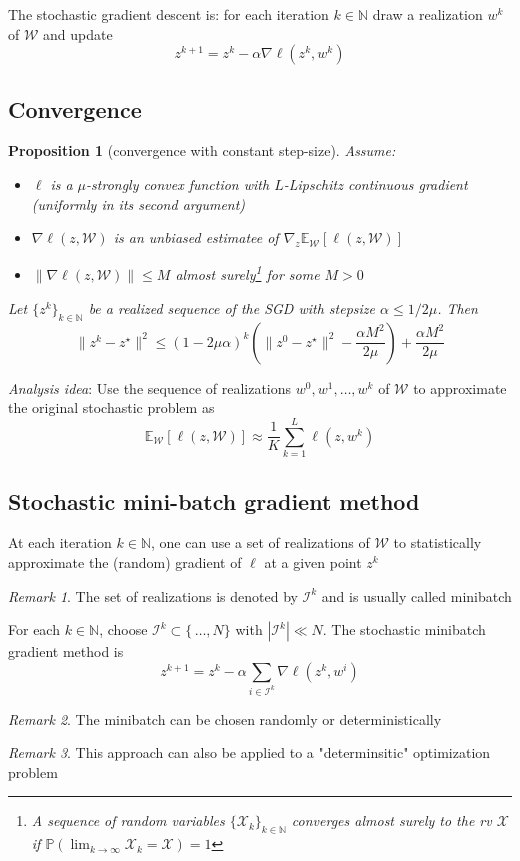 \documentclass{book}
\newcommand{\N}{\mathbb{N}}
\theoremstyle{theoremv2}
\newtheorem{proposition}{Proposition}[chapter]
\theoremstyle{defv2}
\theoremstyle{remark}
\newtheorem*{remark}{Remark}
\theoremstyle{remark}
\theoremstyle{definition}
\theoremstyle{definition}
\begin{document}
The stochastic gradient descent is: for each iteration $k\in\N$ draw a realization $w^k$ of $\mathcal{W}$ and update 
\[
    z^{k+1} = z^k -\alpha\nabla\ell(z^k,w^k)
\]
\subsection{Convergence}
\begin{proposition}[convergence with constant step-size]
    Assume: 
    \begin{itemize}
        \item $\ell$ is a $\mu$-strongly convex function with $L$-Lipschitz continuous gradient (uniformly in its second argument)
        \item $\nabla\ell(z,\mathcal{W})$ is an unbiased estimatee of $\nabla_z\mathbb{E}_{\mathcal{W}}[\ell(z,\mathcal{W})]$
        \item $\|\nabla\ell(z,\mathcal{W})\|\leq M$ almost surely\footnote{A sequence of random variables $\{\mathcal{X}_k\}_{k\in\N}$ converges almost surely to the rv $\mathcal{X}$ if $\mathbb{P}(\lim_{k\to\infty}\mathcal{X}_k=\mathcal{X})=1$} for some $M>0$
    \end{itemize}
    Let $\{z^k\}_{k\in\N}$ be a realized sequence of the SGD with stepsize $\alpha\leq 1/2 \mu$. Then 
    \[
        \|z^k-z^\star\|^2\leq (1-2\mu\alpha)^k\left(\|z^0-z^\star\|^2 - \displaystyle\frac{\alpha M^2}{2\mu}\right) + \displaystyle\frac{\alpha M^2}{2\mu}
    \]
\end{proposition} 
\emph{Analysis idea}: Use the sequence of realizations $w^0,w^1,\dots,w^k$ of $\mathcal{W}$ to approximate the original stochastic problem as 
\[
    \mathbb{E}_{\mathcal{W}}[\ell(z,\mathcal{W})] \approx \displaystyle\frac{1}{K}\displaystyle\sum_{k=1}^{L}\ell(z,w^k)
\]
\subsection{Stochastic mini-batch gradient method}
At each iteration $k\in\N$, one can use a set of realizations of $\mathcal{W}$ to statistically approximate the (random) gradient of $\ell$ at a given point $z^k$
\begin{remark}
    The set of realizations is denoted by $\mathcal{I}^k$ and is usually called minibatch
\end{remark}
For each $k\in\N$, choose $\mathcal{I}^k\subset \{\,\dots,N\}$ with $|\mathcal{I}^k| \ll N$. The stochastic minibatch gradient method is 
\[
    z^{k+1} = z^k - \alpha \displaystyle\sum_{i\in\mathcal{I}^k}\nabla \ell (z^k,w^i)
\]
\begin{remark}
    The minibatch can be chosen randomly or deterministically
\end{remark}
\begin{remark}
    This approach can also be applied to a "determinsitic" optimization problem
\end{remark}
\end{document}
